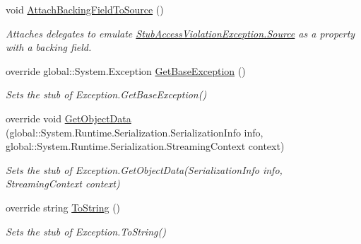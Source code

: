 \begin{DoxyCompactItemize}
void \hyperlink{class_system_1_1_fakes_1_1_stub_access_violation_exception_a33ee4be10b6158ba2cdac4d5b9b5a4c0}{Attach\-Backing\-Field\-To\-Source} ()
\begin{DoxyCompactList}\small\item\em Attaches delegates to emulate \hyperlink{class_system_1_1_fakes_1_1_stub_access_violation_exception_aeb416417305c2c68d704aef1ebb15d59}{Stub\-Access\-Violation\-Exception.\-Source} as a property with a backing field.\end{DoxyCompactList}\item 
override global\-::\-System.\-Exception \hyperlink{class_system_1_1_fakes_1_1_stub_access_violation_exception_a0b28e80b5e124ae0b3bae015f620035c}{Get\-Base\-Exception} ()
\begin{DoxyCompactList}\small\item\em Sets the stub of Exception.\-Get\-Base\-Exception()\end{DoxyCompactList}\item 
override void \hyperlink{class_system_1_1_fakes_1_1_stub_access_violation_exception_a9831eb6a768be4cc530f457a137b0971}{Get\-Object\-Data} (global\-::\-System.\-Runtime.\-Serialization.\-Serialization\-Info info, global\-::\-System.\-Runtime.\-Serialization.\-Streaming\-Context context)
\begin{DoxyCompactList}\small\item\em Sets the stub of Exception.\-Get\-Object\-Data(\-Serialization\-Info info, Streaming\-Context context)\end{DoxyCompactList}\item 
override string \hyperlink{class_system_1_1_fakes_1_1_stub_access_violation_exception_ae2ead066a78d29523c12e0f21de04182}{To\-String} ()
\begin{DoxyCompactList}\small\item\em Sets the stub of Exception.\-To\-String()\end{DoxyCompactList}\end{DoxyCompactItemize}
